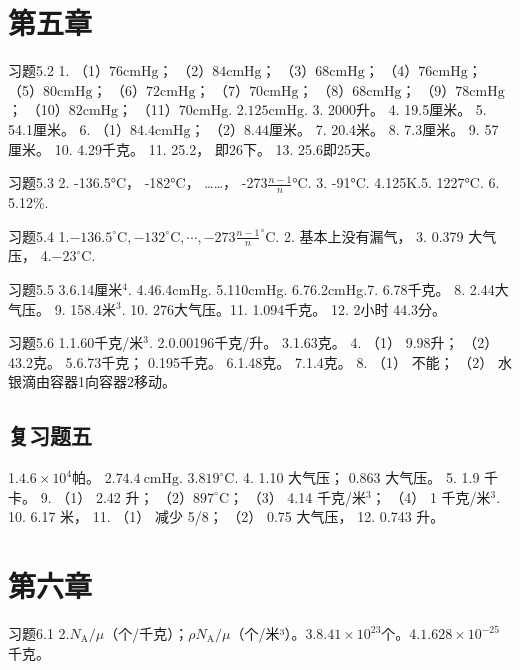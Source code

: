 \section{第五章}\label{ux7b2cux4e94ux7ae0}

习题5.2 1. （1）\(76\mathrm{cmHg}\)； （2）\(84\mathrm{cmHg}\)；
（3）\(68\mathrm{cmHg}\)； （4）\(76\mathrm{cmHg}\)；
（5）\(80\mathrm{cmHg}\)； （6）\(72\mathrm{cmHg}\)；
（7）\(70\mathrm{cmHg}\)； （8）\(68\mathrm{cmHg}\)；
（9）\(78\mathrm{cmHg}\)； （10）\(82\mathrm{cmHg}\)；
（11）\(70\mathrm{cmHg}\). 2.\(125\mathrm{cmHg}\). 3. 2000升。 4.
19.5厘米。 5. 54.1厘米。 6. （1）\(84.4\mathrm{cmHg}\)；
（2）\(8.44\)厘米。 7. 20.4米。 8. 7.3厘米。 9. 57厘米。 10. 4.29千克。
11. 25.2， 即26下。 13. 25.6即25天。

习题5.3 2. -136.5°C， -182°C， \ldots\ldots， -273\(\frac{n-1}{n}\)°C.
3. -91°C. 4.125K.5. 1227°C. 6. 5.12\%.

习题5.4
1.\(-136.5^{\circ}\mathrm{C}, -132^{\circ}\mathrm{C}, \cdots, -273\frac{n-1}{n}^{\circ}\mathrm{C}\).
2. 基本上没有漏气， 3. 0.379 大气压， 4.\(-23^{\circ}\mathrm{C}\).

习题5.5 3.6.14厘米\(^{4}\). 4.46.4cmHg. 5.110cmHg. 6.76.2cmHg.7.
6.78千克。 8. 2.44大气压。 9. 158.4米\(^{3}\). 10. 276大气压。11.
1.094千克。 12. 2小时 44.3分。

习题5.6 1.1.60千克/米\(^{3}\). 2.0.00196千克/升。 3.1.63克。 4. （1）
9.98升； （2） 43.2克。 5.6.73千克； 0.195千克。 6.1.48克。 7.1.4克。 8.
（1） 不能； （2） 水银滴由容器1向容器2移动。

\subsection{复习题五}\label{ux590dux4e60ux9898ux4e94-1}

1.\(4.6 \times 10^{4}\)帕。 2.\(74.4 \mathrm{~cmHg}\).
3.\(819^{\circ} \mathrm{C}\). 4. 1.10 大气压； 0.863 大气压。 5. 1.9
千卡。 9. （1） 2.42 升； （2）\(897^{\circ} \mathrm{C}\)； （3） 4.14
千克/米\(^{3}\)； （4） 1 千克/米\(^{3}\). 10. 6.17 米， 11. （1） 减少
5/8； （2） 0.75 大气压， 12. 0.743 升。

\section{第六章}\label{ux7b2cux516dux7ae0}

习题6.1
2.\(N_{\mathrm{A}} / \mu\)（个/千克）；\(\rho N_{\mathrm{A}} / \mu\)（个/米³）。3.\(8.41 \times 10^{23}\)个。4.\(1.628 \times 10^{-25}\)千克。

